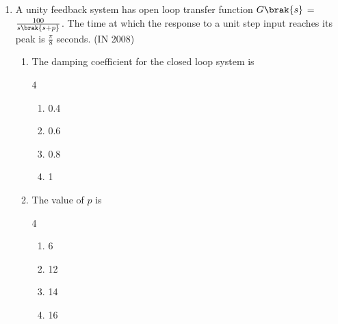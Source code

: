 \begin{enumerate}[label=\thesubsection.\arabic*,ref=\thesubsection.\theenumi]
\item A unity feedback system has open loop transfer function $G\brak{s}$ = $\frac{100}{s\brak{s+p}}$. The time at which the
response to a unit step input reaches its peak is $\frac{\pi}{8}$ seconds.
\hfill{(IN 2008)}
           \begin{enumerate} 
\item The damping coefficient for the closed loop system is 
\begin{multicols}{4}
           \begin{enumerate} 
              \item  0.4      
              \item  0.6
              \item  0.8
              \item  1
            \end{enumerate}
            \end{multicols}
\item The value of $p$ is 
\begin{multicols}{4}
           \begin{enumerate} 
              \item 6           
              \item 12
              \item 14
              \item 16
            \end{enumerate}
\end{multicols}
\end{enumerate}



\end{enumerate}

